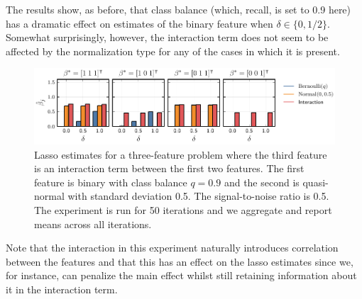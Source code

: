 The results show, as before, that class balance (which, recall, is set to 0.9 here) has a dramatic effect on estimates of the binary feature when \(\delta \in \{0, 1/2\}\). Somewhat surprisingly, however, the interaction term does not seem to be affected by the normalization type for any of the cases in which it is present.

\begin{figure}[htpb]
  \centering
  \includegraphics[]{plots/interactions.pdf}
  \caption{%
    Lasso estimates for a three-feature problem where the third feature is an interaction term between the first two features. The first feature is binary with class balance \(q=0.9\) and the second is quasi-normal with standard deviation 0.5. The signal-to-noise ratio is 0.5. The experiment is run for 50 iterations and we aggregate and report means across all iterations.
  }
\end{figure}

Note that the interaction in this experiment naturally introduces correlation between the features and that this has an effect on the lasso estimates since we, for instance, can penalize the main effect whilst still retaining information about it in the interaction term.


